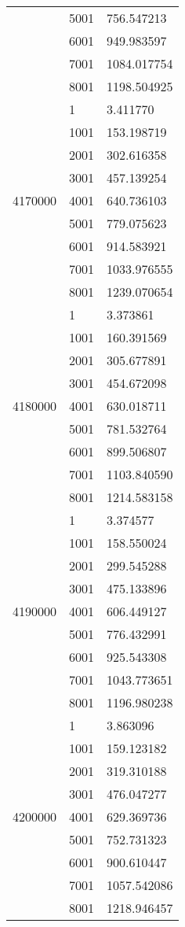 \begin{table}[htb!]
\begin{tabular}{lll}
 & 5001 & 756.547213 \\
 & 6001 & 949.983597 \\
 & 7001 & 1084.017754 \\
 & 8001 & 1198.504925 \\
\multirow[c]{9}{*}{4170000} & 1 & 3.411770 \\
 & 1001 & 153.198719 \\
 & 2001 & 302.616358 \\
 & 3001 & 457.139254 \\
 & 4001 & 640.736103 \\
 & 5001 & 779.075623 \\
 & 6001 & 914.583921 \\
 & 7001 & 1033.976555 \\
 & 8001 & 1239.070654 \\
\multirow[c]{9}{*}{4180000} & 1 & 3.373861 \\
 & 1001 & 160.391569 \\
 & 2001 & 305.677891 \\
 & 3001 & 454.672098 \\
 & 4001 & 630.018711 \\
 & 5001 & 781.532764 \\
 & 6001 & 899.506807 \\
 & 7001 & 1103.840590 \\
 & 8001 & 1214.583158 \\
\multirow[c]{9}{*}{4190000} & 1 & 3.374577 \\
 & 1001 & 158.550024 \\
 & 2001 & 299.545288 \\
 & 3001 & 475.133896 \\
 & 4001 & 606.449127 \\
 & 5001 & 776.432991 \\
 & 6001 & 925.543308 \\
 & 7001 & 1043.773651 \\
 & 8001 & 1196.980238 \\
\multirow[c]{9}{*}{4200000} & 1 & 3.863096 \\
 & 1001 & 159.123182 \\
 & 2001 & 319.310188 \\
 & 3001 & 476.047277 \\
 & 4001 & 629.369736 \\
 & 5001 & 752.731323 \\
 & 6001 & 900.610447 \\
 & 7001 & 1057.542086 \\
 & 8001 & 1218.946457 \\

\end{tabular}
\end{table}
